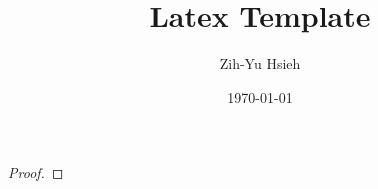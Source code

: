 \documentclass{article}
\title{Latex Template}
\author{Zih-Yu Hsieh}
\date{\today}
\begin{document}
\maketitle

\begin{ques}\label{q1}
\end{ques}

\begin{proof}
\end{proof}

\newpage
\end{document}
